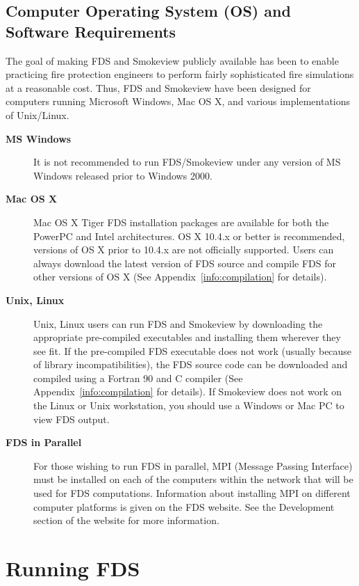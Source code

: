 \documentclass[11pt]{book}
\begin{document}
\section{Computer Operating System (OS) and Software Requirements}

The goal of making FDS and Smokeview publicly available has been to enable
practicing fire protection engineers to perform fairly sophisticated
fire simulations at a reasonable cost. Thus, FDS and Smokeview have been
designed for computers running Microsoft Windows, Mac OS X, and various
implementations of Unix/Linux.

\begin{description}
\item[{\bf MS Windows}]
It is not recommended to run FDS/Smokeview under any version of MS Windows
released prior to Windows 2000.

\item[{\bf Mac OS X}]
Mac OS X Tiger FDS installation packages are available for both the PowerPC and Intel architectures.
OS X 10.4.x or better is recommended, versions of OS X prior to 10.4.x are not officially supported.
Users can always download the latest version of FDS source  and
compile FDS for other versions of OS X (See Appendix~\ref{info:compilation} for details).

\item[{\bf Unix, Linux}]
Unix, Linux users can run FDS and Smokeview by downloading the appropriate pre-compiled
executables and installing them wherever they see fit. If the pre-compiled
FDS executable does not work (usually because of library incompatibilities),
the FDS source code can be downloaded and compiled using a Fortran 90 and
C compiler (See Appendix~\ref{info:compilation} for details). If Smokeview
does not work on the Linux or Unix workstation, you should use a Windows or Mac PC to view FDS output.

\item[{\bf FDS in Parallel}] For those wishing to run FDS in parallel,
MPI (Message Passing Interface) must be installed on each of the
computers within the network that will be used for FDS computations.
Information about installing MPI on different computer platforms is given on the FDS website.
See the Development section of the website for more information.
\end{description}




\chapter{Running FDS}
\label{info:runningFDS}
\end{document}
